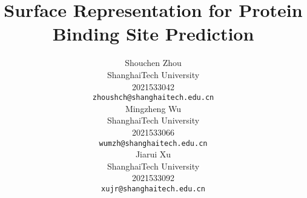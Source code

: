 \documentclass{article}
\title{Surface Representation for Protein Binding Site Prediction}
\author{%
  Shouchen Zhou\\
  ShanghaiTech University\\
  2021533042\\
  \texttt{zhoushch@shanghaitech.edu.cn} \\
  \And
  Mingzheng Wu \\
  ShanghaiTech University\\
  2021533066\\
  \texttt{wumzh@shanghaitech.edu.cn} \\
  \And
  Jiarui Xu \\
  ShanghaiTech University\\
  2021533092\\
  \texttt{xujr@shanghaitech.edu.cn} \\
}
\begin{document}
\maketitle







\newpage
{
\small


}

\end{document}

